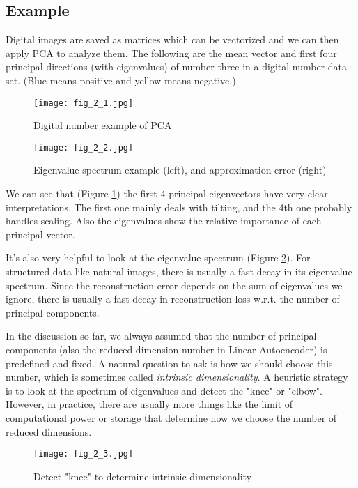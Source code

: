 \documentclass[../book-template.tex]{subfiles}
\begin{document}
\subsection{Example}
Digital images are saved as matrices which can be vectorized and we can then apply PCA to analyze them. The following are the mean vector and first four principal directions (with eigenvalues) of number three in a digital number data set. (Blue means positive and yellow means negative.)
\begin{figure}[h]
    \centering 
    \texttt{[image: fig\_2\_1.jpg]} 
    \caption{Digital number example of PCA}\label{fig_2_1}
\end{figure}
\begin{figure}[h] 
    \centering 
    \texttt{[image: fig\_2\_2.jpg]} 
    \caption{Eigenvalue spectrum example (left), and approximation error (right)}\label{fig_2_2}
\end{figure}
\par We can see that (Figure \ref{fig_2_1}) the first 4 principal eigenvectors have very clear interpretations. The first one mainly deals with tilting, and the 4th one probably handles scaling. Also the eigenvalues show the relative importance of each principal vector.
\par It's also very helpful to look at the eigenvalue spectrum (Figure \ref{fig_2_2}). For structured data like natural images, there is usually a fast decay in its eigenvalue spectrum. Since the reconstruction error depends on the sum of eigenvalues we ignore, there is usually a fast decay in reconstruction loss w.r.t. the number of principal components.
\par In the discussion so far, we always assumed that the number of principal components (also the reduced dimension number in Linear Autoencoder) is predefined and fixed. A natural question to ask is how we should choose this number, which is sometimes called \emph{intrinsic dimensionality}. A heuristic strategy is to look at the spectrum of eigenvalues and detect the "knee" or "elbow". However, in practice, there are usually more things like the limit of computational power or storage that determine how we choose the number of reduced dimensions.
\begin{figure}[h] 
    \centering 
    \texttt{[image: fig\_2\_3.jpg]} 
    \caption{Detect "knee" to determine intrinsic dimensionality}\label{fig_2_3}
\end{figure}
\end{document}
